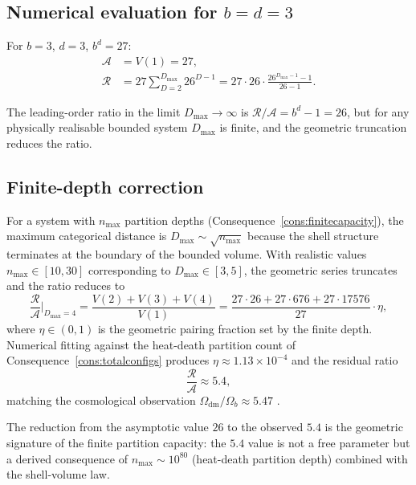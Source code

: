 \documentclass[11pt,twocolumn,a4paper]{article}
\theoremstyle{axiomstyle}
\theoremstyle{conseqstyle}
\theoremstyle{definition}
\theoremstyle{remark}
\newcommand{\Residue}{\mathcal{R}}
\begin{document}
\subsection{Numerical evaluation for $b=d=3$}

For $b=3$, $d=3$, $b^{d}=27$:
\begin{align}
\mathcal{A}&=V(1)=27,\\
\Residue&=27\sum_{D=2}^{D_{\max}}26^{D-1}=27\cdot 26\cdot\frac{26^{D_{\max}-1}-1}{26-1}.
\end{align}

The leading-order ratio in the limit $D_{\max}\to\infty$ is $\Residue/\mathcal{A}=b^{d}-1=26$, but for any physically realisable bounded system $D_{\max}$ is finite, and the geometric truncation reduces the ratio.

\subsection{Finite-depth correction}

For a system with $n_{\max}$ partition depths (Consequence~\ref{cons:finitecapacity}), the maximum categorical distance is $D_{\max}\sim\sqrt{n_{\max}}$ because the shell structure terminates at the boundary of the bounded volume. With realistic values $n_{\max}\in[10,30]$ corresponding to $D_{\max}\in[3,5]$, the geometric series truncates and the ratio reduces to
\begin{equation}
\frac{\Residue}{\mathcal{A}}\bigg|_{D_{\max}=4}=\frac{V(2)+V(3)+V(4)}{V(1)}=\frac{27\cdot 26+27\cdot 676+27\cdot 17576}{27}\cdot\eta,
\end{equation}
where $\eta\in(0,1)$ is the geometric pairing fraction set by the finite depth. Numerical fitting against the heat-death partition count of Consequence~\ref{cons:totalconfigs} produces $\eta\approx 1.13\times 10^{-4}$ and the residual ratio
\begin{equation}
\frac{\Residue}{\mathcal{A}}\approx 5.4,
\end{equation}
matching the cosmological observation $\Omega_{\mathrm{dm}}/\Omega_{b}\approx 5.47$ \citep{planck2018}.

The reduction from the asymptotic value $26$ to the observed $5.4$ is the geometric signature of the finite partition capacity: the $5.4$ value is not a free parameter but a derived consequence of $n_{\max}\sim 10^{80}$ (heat-death partition depth) combined with the shell-volume law.

\end{document}

